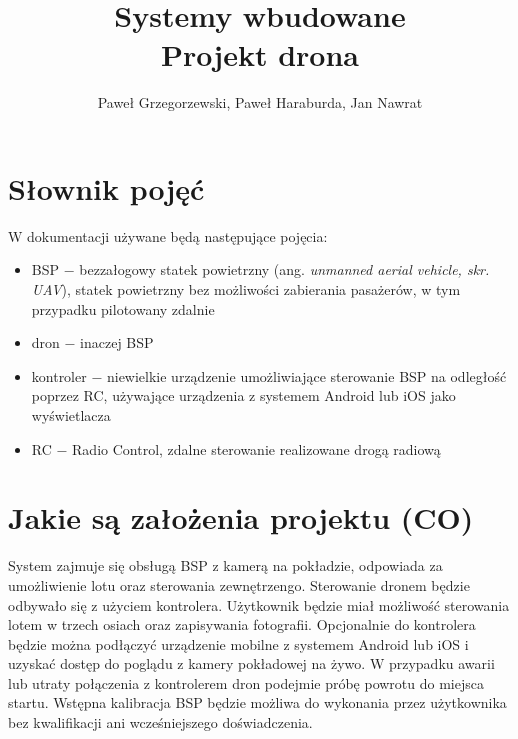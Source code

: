 \documentclass[12pt]{article}
\title{Systemy wbudowane\\ Projekt drona}
\author{Paweł Grzegorzewski, Paweł Haraburda,  Jan Nawrat}
\date{}
\begin{document}
\maketitle

\section{Słownik pojęć}

W dokumentacji używane będą następujące pojęcia:

\begin{itemize}
    \item BSP $ - $ bezzałogowy statek powietrzny (ang. \textit{unmanned aerial vehicle, skr. UAV}), statek powietrzny bez możliwości zabierania pasażerów, w tym przypadku pilotowany zdalnie
    \item dron $ - $ inaczej BSP
    \item kontroler $ - $ niewielkie urządzenie umożliwiające sterowanie BSP na odległość poprzez RC, używające urządzenia z systemem Android lub iOS jako wyświetlacza
    \item RC $ - $ Radio Control, zdalne sterowanie realizowane drogą radiową
\end{itemize}

\section{Jakie są założenia projektu (CO)}
System zajmuje się obsługą BSP z kamerą na pokładzie, odpowiada za umożliwienie lotu oraz sterowania zewnętrzengo. Sterowanie dronem będzie odbywało się z użyciem kontrolera. Użytkownik będzie miał możliwość sterowania lotem w trzech osiach oraz zapisywania fotografii. Opcjonalnie do kontrolera będzie można podłączyć urządzenie mobilne z systemem Android lub iOS i uzyskać dostęp do poglądu z kamery pokładowej na żywo. W przypadku awarii lub utraty połączenia z kontrolerem dron podejmie próbę powrotu do miejsca startu. Wstępna kalibracja BSP będzie możliwa do wykonania przez użytkownika bez kwalifikacji ani wcześniejszego doświadczenia.
\end{document}
